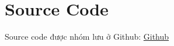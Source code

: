 \section{Source Code}
Source code được nhóm lưu ở Github: \href{https://github.com/HK241-HCSDL-L11G2/QuanLyNhanSu-ChamCong.git}{Github}

\newpage